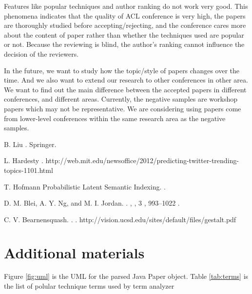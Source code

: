 \documentclass[11pt,letterpaper]{article}
\begin{document}
Features like popular techniques and author ranking do not work very good. 
This phenomena indicates that the quality of ACL conference is very high, the papers are thoroughly studied before accepting/rejecting, and the conference cares more about the content of paper rather than whether the techniques used are popular or not. 
Because the reviewing is blind, the author's ranking cannot influence the decision of the reviewers. 


In the future, we want to study how the topic/style of papers changes over the time. 
And we also want to extend our research to other conferences in other area.
We want to find out the main difference between the accepted papers in different conferences, and different areas. 
Currently, the negative samples are workshop papers which may not be representative. 
We are considering using papers come from lower-level conferences within the same research area as the negative samples. 



\begin{thebibliography}{}

B. Liu
.
\newblock Springer.

L. Hardesty
.
\newblock http://web.mit.edu/newsoffice/2012/predicting-twitter-trending-topics-1101.html

T. Hofmann
{Probabilistic Latent Semantic Indexing}.
.

D. M. Blei, A. Y. Ng, and M. I. Jordan. 
.
,
, 
3 , 993--1022 .

C. V. Bearnensquash.
.
.
\newblock http://vision.ucsd.edu/sites/default/files/gestalt.pdf

\end{thebibliography}




\appendix

\section{Additional materials}
Figure \ref{fig:uml} is the UML for the parsed Java Paper object.  
Table \ref{tab:terms} is the list of polular technique terms used by term analyzer
\end{document}
